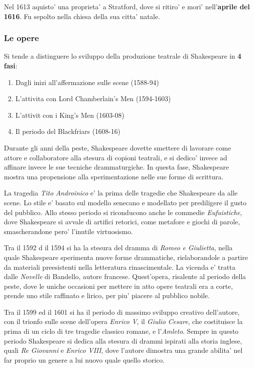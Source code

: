 \documentclass{article}
\begin{document}
{{    Nel 1613 aquisto' una proprieta' a Stratford, dove si ritiro' e mori' nell'\textbf{aprile del 1616}. Fu sepolto nella chiesa della sua citta' natale.

    \subsubsection{Le opere}
    Si tende a distinguere lo sviluppo della produzione teatrale di Shakespeare in \textbf{4 fasi}:
    \begin{enumerate}
      \item Dagli inizi all'affermazione sulle scene (1588-94)
      \item L'attivita con Lord Chamberlain's Men (1594-1603)
      \item L'attivit con i King's Men (1603-08)
      \item Il periodo del Blackfriars (1608-16)
    \end{enumerate}

    Durante gli anni della peste, Shakespeare dovette smettere di lavorare come attore e collaboratore alla stesura di copioni teatrali, e si dedico' invece ad affinare invece le sue tecniche drammaturgiche. In questa fase, Shakespeare mostra una propensione alla sperimentazione nelle sue forme di scrittura.

    La tragedia \textit{Tito Androinico} e' la prima delle tragedie che Shakespeare da alle scene. Lo stile e' basato sul modello senecano e modellato per prediligere il gusto del pubblico. Allo stesso periodo si riconducono anche le commedie \textit{Eufuistiche}, dove Shakespeare si avvale di artifici retorici, come metafore e giochi di parole, smascherandone pero' l'inutile virtuosismo.

    Tra il 1592 d il 1594 si ha la stesura del dramma di \textit{Romeo e Giulietta}, nella quale Shakespeare sperimenta nuove forme drammatiche, rielaborandole a partire da materiali preesistenti nella letteratura rinascimentale. La vicenda e' tratta dalle \textit{Novelle} di Bandello, autore francese. Quest'opera, risalente al periodo della peste, dove le uniche occasioni per mettere in atto opere teatrali era a corte, prende uno stile raffinato e lirico, per piu' piacere al pubblico nobile.

    Tra il 1599 ed il 1601 si ha il periodo di massimo sviluppo creativo dell'autore, con il trionfo sulle scene dell'opera \textit{Enrico V}, il \textit{Giulio Cesare}, che costituisce la prima di un ciclo di tre tragedie classico romane, e l'\textit{Amleto}. Sempre in questo periodo Shakespeare si dedica alla stesura di drammi ispirati alla storia inglese, quali \textit{Re Giovanni} e \textit{Enrico VIII}, dove l'autore dimostra una grande abilita' nel far proprio un genere a lui nuovo quale quello storico.

}}
\end{document}
